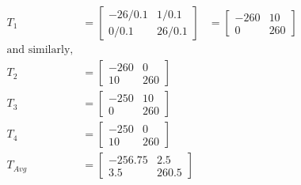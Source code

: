     \begin{equation}
        \begin{aligned}
            T_1 &= 
            \begin{bmatrix}
                -26/0.1 & 1/0.1 \\
                0/0.1 & 26/0.1
            \end{bmatrix} &= 
            \begin{bmatrix}
                -260 & 10 \\
                0 & 260
            \end{bmatrix}
            \\
            \text{and similarly,}
            \\
            T_2 &= 
            \begin{bmatrix}
                -260 & 0 \\
                10 & 260
            \end{bmatrix}
            \\
            T_3 &= 
            \begin{bmatrix}
                -250 & 10 \\
                0 & 260
            \end{bmatrix}
            \\
            T_4 &= 
            \begin{bmatrix}
                -250 & 0 \\
                10 & 260
            \end{bmatrix}
            \\
            T_{Avg} &= 
            \begin{bmatrix}
                -256.75 & 2.5 \\
                3.5 & 260.5
            \end{bmatrix}
        \end{aligned}
        \label{eqn:calib_matrices_permutations}
    \end{equation}

